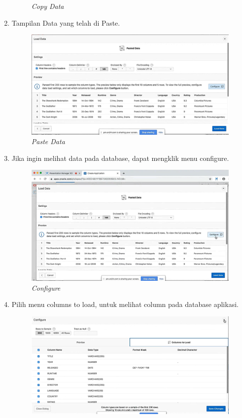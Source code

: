 \begin{enumerate}
\begin{figure}[H]
    \caption{\textit{Copy Data}}
    \label{Data1}
\end{figure}
 \item Tampilan Data yang telah di Paste.
 \begin{figure}[H]
    \centering
    \includegraphics[scale=0.5]{figures/10}
    \caption{\textit{Paste Data}}
    \label{Data2}
\end{figure}
 \item Jika ingin melihat data pada database, dapat mengklik menu configure.
 \begin{figure}[H]
    \centering
    \includegraphics[scale=0.5]{figures/11}
    \caption{\textit{Configure}}
    \label{Configure}
\end{figure}
 \item Pilih menu columns to load, untuk melihat column pada database aplikasi.
 \begin{figure}[H]
    \centering
    \includegraphics[scale=0.5]{figures/12}

\end{figure}
\end{enumerate}
